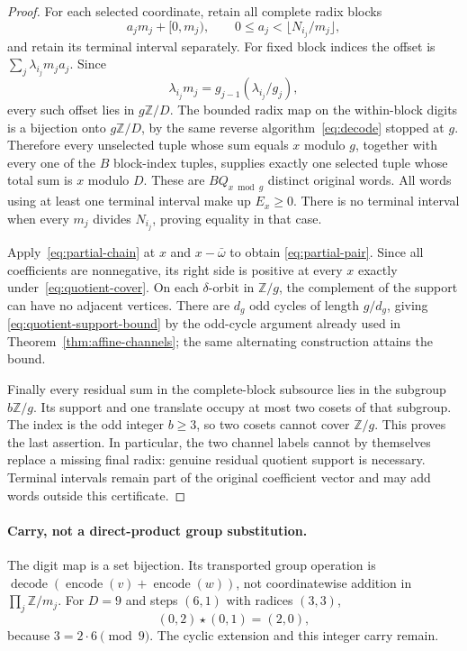 \begin{proof}
For each selected coordinate, retain all complete radix blocks
\[
 a_jm_j+[0,m_j),\qquad
 0\le a_j<\lfloor N_{i_j}/m_j\rfloor,
\]
and retain its terminal interval separately. For fixed block indices the
offset is $\sum_j\lambda_{i_j}m_ja_j$. Since
\[
 \lambda_{i_j}m_j
 =g_{j-1}(\lambda_{i_j}/g_j),
\]
every such offset lies in $g\mathbb Z/D$. The bounded radix map on the
within-block digits is a bijection onto $g\mathbb Z/D$, by the same reverse
algorithm~\eqref{eq:decode} stopped at $g$. Therefore every unselected tuple
whose sum equals $x$ modulo $g$, together with every one of the $B$ block-index
tuples, supplies exactly one selected tuple whose total sum is $x$ modulo
$D$. These are $BQ_{x\bmod g}$ distinct original words. All words using at
least one terminal interval make up $E_x\ge0$. There is no terminal interval
when every $m_j$ divides $N_{i_j}$, proving equality in that case.

Apply~\eqref{eq:partial-chain} at $x$ and $x-\bar\omega$ to obtain
\eqref{eq:partial-pair}. Since all coefficients are nonnegative, its right
side is positive at every $x$ exactly under~\eqref{eq:quotient-cover}. On each
$\delta$-orbit in $\mathbb Z/g$, the complement of the support can have no
adjacent vertices. There are $d_g$ odd cycles of length $g/d_g$, giving
\eqref{eq:quotient-support-bound} by the odd-cycle argument already used in
Theorem~\ref{thm:affine-channels}; the same alternating construction attains
the bound.

Finally every residual sum in the complete-block subsource lies in the subgroup
$b\mathbb Z/g$. Its support
and one translate occupy at most two cosets of that subgroup. The index is the
odd integer $b\ge3$, so two cosets cannot cover $\mathbb Z/g$. This proves the
last assertion. In particular, the two channel labels cannot by themselves
replace a missing final radix: genuine residual quotient support is necessary.
Terminal intervals remain part of the original coefficient vector and may add
words outside this certificate.
\end{proof}

\paragraph{Carry, not a direct-product group substitution.}
The digit map is a set bijection. Its transported group operation is
$\operatorname{decode}(\operatorname{encode}(v)+\operatorname{encode}(w))$,
not coordinatewise addition in $\prod_j\mathbb Z/m_j$. For $D=9$ and steps
$(6,1)$ with radices $(3,3)$,
\[
 (0,2)\star(0,1)=(2,0),
\]
 because $3=2\cdot6\pmod9$. The cyclic extension and this integer carry remain.

